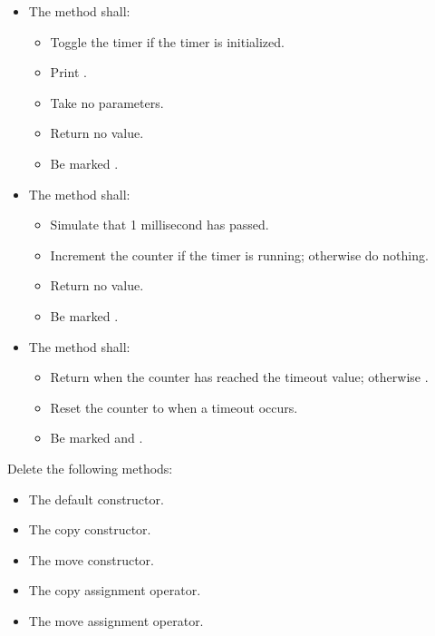 \begin{parts}
\begin{itemize}
\begin{itemize}
      \item Take no parameters.
      \item Return no value.
      \item Be marked .
    \end{itemize}
    \item The method  shall:
    \begin{itemize}
      \item Toggle the timer if the timer is initialized.
      \item Print .
      \item Take no parameters.
      \item Return no value.
      \item Be marked .
    \end{itemize}
    \item The method  shall:
    \begin{itemize}
      \item Simulate that 1 millisecond has passed.
      \item Increment the counter if the timer is running; otherwise do nothing.
      \item Return no value.
      \item Be marked .
    \end{itemize}
    \item The method  shall:
    \begin{itemize}
      \item Return  when the counter has reached the timeout value; otherwise
        .
      \item Reset the counter to  when a timeout occurs.
      \item Be marked  and \code{[[nodiscard]]}.
    \end{itemize}
  \end{itemize}

  \item Delete the following methods:
  \begin{itemize}
    \item The default constructor.
    \item The copy constructor.
    \item The move constructor.
    \item The copy assignment operator.
    \item The move assignment operator.
  \end{itemize}
\end{parts}

